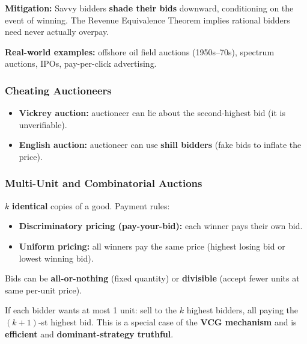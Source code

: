 \textbf{Mitigation:} Savvy bidders \textbf{shade their bids} downward, conditioning on the event of winning. The Revenue Equivalence Theorem implies rational bidders need never actually overpay.

\textbf{Real-world examples:} offshore oil field auctions (1950s--70s), spectrum auctions, IPOs, pay-per-click advertising.

\separator

\subsubsection{Cheating Auctioneers}

\begin{itemize}
  \item \textbf{Vickrey auction:} auctioneer can lie about the second-highest bid (it is unverifiable).
  \item \textbf{English auction:} auctioneer can use \textbf{shill bidders} (fake bids to inflate the price).
\end{itemize}

\separator

\subsubsection{Multi-Unit and Combinatorial Auctions}

\begin{defbox}
$k$ \textbf{identical} copies of a good. Payment rules:
\begin{itemize}
  \item \textbf{Discriminatory pricing (pay-your-bid):} each winner pays their own bid.
  \item \textbf{Uniform pricing:} all winners pay the same price (highest losing bid or lowest winning bid).
\end{itemize}
Bids can be \textbf{all-or-nothing} (fixed quantity) or \textbf{divisible} (accept fewer units at same per-unit price).
\end{defbox}

\begin{defbox}
If each bidder wants at most 1 unit: sell to the $k$ highest bidders, all paying the $(k+1)$-st highest bid. This is a special case of the \textbf{VCG mechanism} and is \textbf{efficient} and \textbf{dominant-strategy truthful}.
\end{defbox}


